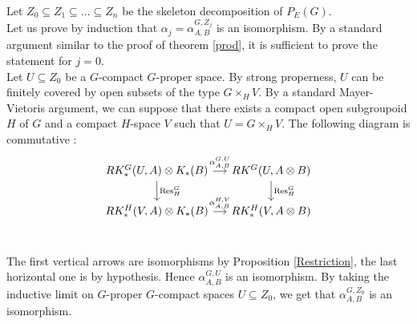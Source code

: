\begin{dem}
Let $Z_0\subseteq Z_1\subseteq ... \subseteq Z_n $ be the skeleton decomposition of $P_E(G)$.\\

Let us prove by induction that $\alpha_j=\alpha^{G,Z_j}_{A,B}$ is an isomorphism. By a standard argument similar to the proof of theorem \ref{prod}, it is sufficient to prove the statement for $j=0$.\\

Let $U\subseteq Z_0$ be a $G$-compact $G$-proper space. By strong properness, $U$ can be finitely covered by open subsets of the type $G \times_H V$. By a standard Mayer-Vietoris argument, we can suppose that there exists a compact open subgroupoid $H$ of $G$ and a compact $H$-space $V$ such that $U = G \times_H V$. The following diagram is commutative :
\[\begin{tikzcd}[column sep = small] 
RK_*^G(U,A)\otimes K_*(B) \arrow{r}{\alpha_{A,B}^{G,U}} \arrow{d}{\text{Res}_H^G} & RK^G(U, A\otimes B) \arrow{d}{\text{Res}_H^G}\\
RK_*^H(V, A)\otimes K_*(B) \arrow{r}{\alpha_{ A,B}^{H,V}} & 
	RK_*^H(V,  A\otimes B)\\
\end{tikzcd}\]

The first vertical arrows are isomorphisms by Proposition \ref{Restriction}, the last horizontal one is by hypothesis. Hence $\alpha_{A,B}^{G,U}$ is an isomorphism. By taking the inductive limit on $G$-proper $G$-compact spaces $U\subseteq Z_0$, we get that $\alpha_{A,B}^{G,Z_0}$ is an isomorphism.
\end{dem}

